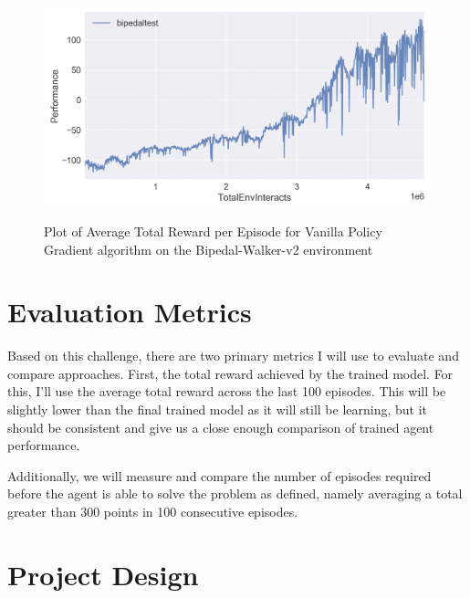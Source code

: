\documentclass{article}
\begin{document}
\begin{figure}[h]
\caption{Plot of Average Total Reward per Episode for Vanilla Policy Gradient algorithm on the Bipedal-Walker-v2 environment }
\centering
\includegraphics[scale=0.25]{images/bipedal-vpg-performance-plot.png}
\label{fig:benchmark_results}
\end{figure}

\section{Evaluation Metrics}
\label{sec:metrics}
Based on this challenge, there are two primary metrics I will use to evaluate and compare approaches. First, the total reward achieved by the trained model. For this, I'll use the average total reward across the last 100 episodes. This will be slightly lower than the final trained model as it will still be learning, but it should be consistent and give us a close enough comparison of trained agent performance. 

Additionally, we will measure and compare the number of episodes required before the agent is able to solve the problem as defined, namely averaging a total greater than 300 points in 100 consecutive episodes.

\section{Project Design}
\label{sec:design}
\end{document}
